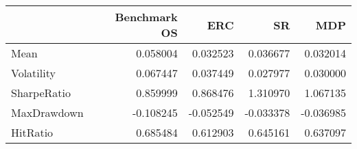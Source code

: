 \begin{tabular}{lrrrr}
\toprule
{} &  Benchmark OS &       ERC &        SR &       MDP \\
\midrule
Mean        &      0.058004 &  0.032523 &  0.036677 &  0.032014 \\
Volatility  &      0.067447 &  0.037449 &  0.027977 &  0.030000 \\
SharpeRatio &      0.859999 &  0.868476 &  1.310970 &  1.067135 \\
MaxDrawdown &     -0.108245 & -0.052549 & -0.033378 & -0.036985 \\
HitRatio    &      0.685484 &  0.612903 &  0.645161 &  0.637097 \\
\bottomrule
\end{tabular}
